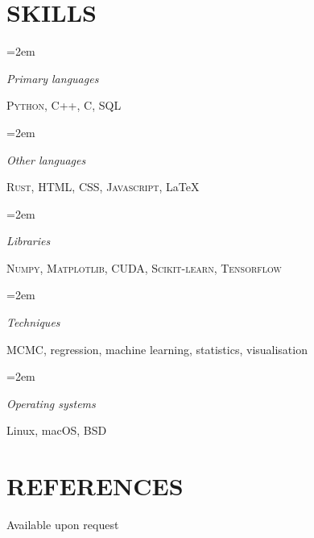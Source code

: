 \documentclass[paper=a4,fontsize=11pt]{scrartcl} %
\newlength{\spacebox}
\newlength{\skillbox}
\newcommand{\NewPart}[1]{\section*{\uppercase{#1}}}
\newcommand{\PersonalEntry}[2]{
		\noindent\hangindent=2em\hangafter=0 %
		\parbox{\spacebox}{        %
		\textit{#1}}		       %
		\hspace{1.5em} #2 \par}    %
\newcommand{\SkillsEntry}[2]{      %
		\noindent\hangindent=2em\hangafter=0 %
		\parbox{\skillbox}{        %
		\textit{#1}}			   %
		\hspace{1.5em} #2 \par}    %
\begin{document}
\NewPart{Skills}{}

\SkillsEntry{Primary \mbox{languages}}{\textsc{Python}, \textsc{C++}, \textsc{C}, \textsc{SQL}}
\SkillsEntry{Other \mbox{languages}}{\textsc{Rust}, \textsc{HTML}, \textsc{CSS}, \textsc{Javascript}, \LaTeX}
\SkillsEntry{Libraries}{\textsc{Numpy}, \textsc{Matplotlib}, \textsc{CUDA}, \textsc{Scikit-learn}, \mbox{\textsc{Tensorflow}}}
\SkillsEntry{Techniques}{MCMC, regression, machine learning, statistics, visualisation}
\SkillsEntry{Operating systems}{Linux, macOS, BSD}


\NewPart{References}{}
Available upon request
\end{document}
